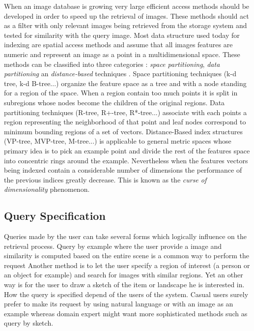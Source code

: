       When an image database is growing very large efficient access methods should be developed in order to speed up the retrieval of images. These methods should act as a filter with only relevant images being retrieved from the storage system and tested for similarity with the query image. Most data structure used today for indexing are spatial access methods and assume that all images features are numeric and represent an image as a point in a multidimensional space. These methods can be classified into three categories : \textit{space partitioning}, \textit{data partitioning} an \textit{distance-based} techniques \cite{smeulders2000content}. Space partitioning techniques (k-d tree, k-d B-tree...) organize the feature space as a tree and with a node standing for a region of the space. When a region contain too much points it is split in subregions whose nodes become the children of the original regions. Data partitioning techniques (R-tree,  R+-tree, R*-tree...) associate with each points a region representing the neighborhood of that point and leaf nodes correspond to minimum bounding regions of a set of vectors. Distance-Based index structures (VP-tree, MVP-tree, M-tree...) is applicable to general metric spaces whose primary idea is to pick an example point and divide the rest of the features space into concentric rings around the example. Nevertheless when the features vectors being indexed contain a considerable number of dimensions the performance of the previous indices greatly decrease. This is known as the \textit{curse of dimensionality} phenomenon.

    \subsection{Query Specification}

      Queries made by the user can take several forms which logically influence on the retrieval process. Query by example where the user provide a image and similarity is computed based on the entire scene is a common way to perform the request Another method is to let the user specify a region of interest (a person or an object for example) and search for images with similar regions. Yet an other way is for the user to draw a sketch of the item or landscape he is interested in.
      How the query is specified depend of the users of the system. Casual users surely prefer to make its request by using natural language  or with an image as an example whereas domain expert might want more sophisticated methods such as query by sketch.


